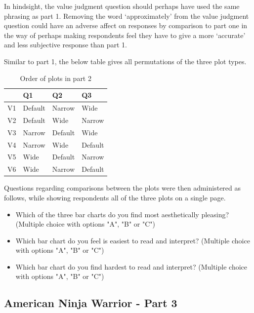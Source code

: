 \documentclass[
  11pt,
]{book}
\begin{document}
In hindsight, the value judgment question should perhaps have used the
same phrasing as part 1. Removing the word `approximately' from the
value judgment question could have an adverse affect on responses by
comparison to part one in the way of perhaps making respondents feel
they have to give a more `accurate' and less subjective response than
part 1.

Similar to part 1, the below table gives all permutations of the three
plot types.

\begin{center}
\begin{table}

\caption{\label{tab:unnamed-chunk-6}Order of plots in part 2}
\centering
\begin{tabular}[t]{l|l|l|l}
\hline
  & Q1 & Q2 & Q3\\
\hline
V1 & Default & Narrow & Wide\\
\hline
V2 & Default & Wide & Narrow\\
\hline
V3 & Narrow & Default & Wide\\
\hline
V4 & Narrow & Wide & Default\\
\hline
V5 & Wide & Default & Narrow\\
\hline
V6 & Wide & Narrow & Default\\
\hline
\end{tabular}
\end{table}
\end{center}

Questions regarding comparisons between the plots were then administered
as follows, while showing respondents all of the three plots on a single
page.

\begin{itemize}
  \item Which of the three bar charts do you find most aesthetically pleasing? (Multiple choice with options "A", "B" or "C")
  \item Which bar chart do you feel is easiest to read and interpret? (Multiple choice with options "A", "B" or "C")
  \item Which bar chart do you find hardest to read and interpret? (Multiple choice with options "A", "B" or "C")
\end{itemize}

\subsection{American Ninja Warrior - Part 3}
\end{document}
